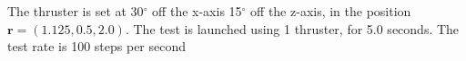 The thruster is set at 30$^\circ$ off the x-axis 15$^\circ$ off the z-axis, in the position $\bm r = \left(1.125,0.5,2.0\right)$. The test is launched using 1 thruster, for 5.0 seconds. The test rate is 100 steps per second